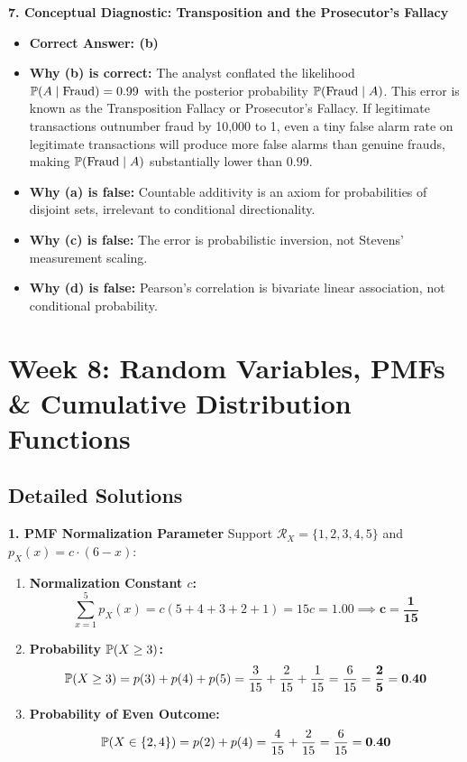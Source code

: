 \textbf{7. Conceptual Diagnostic: Transposition and the Prosecutor's Fallacy}
\begin{itemize}
    \item \textbf{Correct Answer: (b)}
    \item \textbf{Why (b) is correct:} The analyst conflated the likelihood $\P(A \mid \text{Fraud}) = 0.99$ with the posterior probability $\P(\text{Fraud} \mid A)$. This error is known as the Transposition Fallacy or Prosecutor's Fallacy. If legitimate transactions outnumber fraud by 10,000 to 1, even a tiny false alarm rate on legitimate transactions will produce more false alarms than genuine frauds, making $\P(\text{Fraud} \mid A)$ substantially lower than $0.99$.
    \item \textbf{Why (a) is false:} Countable additivity is an axiom for probabilities of disjoint sets, irrelevant to conditional directionality.
    \item \textbf{Why (c) is false:} The error is probabilistic inversion, not Stevens' measurement scaling.
    \item \textbf{Why (d) is false:} Pearson's correlation is bivariate linear association, not conditional probability.
\end{itemize}


\section*{Week 8: Random Variables, PMFs \& Cumulative Distribution Functions}

\subsection*{Detailed Solutions}

\textbf{1. PMF Normalization Parameter}
Support $\mathcal{R}_X = \{1, 2, 3, 4, 5\}$ and $p_X(x) = c \cdot (6 - x)$:
\begin{enumerate}
    \item \textbf{Normalization Constant $c$:}
    $$\sum_{x=1}^5 p_X(x) = c(5 + 4 + 3 + 2 + 1) = 15c = 1.00 \implies \mathbf{c = \frac{1}{15}}$$
    \item \textbf{Probability $\P(X \ge 3)$:}
    $$\P(X \ge 3) = p(3) + p(4) + p(5) = \frac{3}{15} + \frac{2}{15} + \frac{1}{15} = \frac{6}{15} = \mathbf{\frac{2}{5} = 0.40}$$
    \item \textbf{Probability of Even Outcome:}
    $$\P(X \in \{2, 4\}) = p(2) + p(4) = \frac{4}{15} + \frac{2}{15} = \frac{6}{15} = \mathbf{0.40}$$
\end{enumerate}


